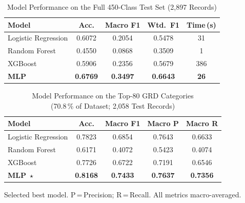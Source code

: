 \documentclass[journal]{IEEEtran}
\begin{document}
\begin{table}[!t]
  \caption{Model Performance on the Full 450-Class Test Set
           (2,897 Records)}
  \label{tab:fullresults}
  \centering
  \renewcommand{\arraystretch}{1.15}
  \begin{tabular}{@{}lcccc@{}}
    \toprule
    \textbf{Model} & \textbf{Acc.} & \textbf{Macro F1}
                   & \textbf{Wtd.\ F1} & \textbf{Time\,(s)} \\
    \midrule
    Logistic Regression & 0.6072 & 0.2054 & 0.5478 & \phantom{0}31 \\
    Random Forest       & 0.4550 & 0.0868 & 0.3509 & \phantom{00}1 \\
    XGBoost             & 0.5906 & 0.2356 & 0.5679 & 386           \\
    \textbf{MLP}        & \textbf{0.6769} & \textbf{0.3497}
                        & \textbf{0.6643} & \textbf{\phantom{0}26} \\
    \bottomrule
  \end{tabular}
\end{table}

\begin{table}[!t]
  \caption{Model Performance on the Top-80 GRD Categories\\
           (70.8\,\% of Dataset; 2,058 Test Records)}
  \label{tab:top80}
  \centering
  \renewcommand{\arraystretch}{1.15}
  \begin{threeparttable}
    \begin{tabular}{@{}lcccc@{}}
      \toprule
      \textbf{Model} & \textbf{Acc.} & \textbf{Macro F1}
                     & \textbf{Macro P} & \textbf{Macro R} \\
      \midrule
      Logistic Regression & 0.7823 & 0.6854 & 0.7643 & 0.6633 \\
      Random Forest       & 0.6171 & 0.4072 & 0.5423 & 0.4074 \\
      XGBoost             & 0.7726 & 0.6722 & 0.7191 & 0.6546 \\
      \textbf{MLP}~$\star$
                          & \textbf{0.8168}
                          & \textbf{0.7433}
                          & \textbf{0.7637}
                          & \textbf{0.7356} \\
      \bottomrule
    \end{tabular}
    \begin{tablenotes}
      \small
      \item[$\star$] Selected best model.
            P\,=\,Precision; R\,=\,Recall.
            All metrics macro-averaged.
    \end{tablenotes}
  \end{threeparttable}
\end{table}
\end{document}
